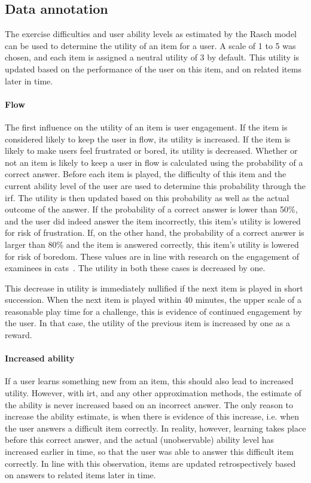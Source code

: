 \subsection{Data annotation}
\label{sec:utility}
The exercise difficulties and user ability levels as estimated by the Rasch model can be used to determine the utility of an item for a user.
A scale of 1 to 5 was chosen, and each item is assigned a neutral utility of 3 by default.
This utility is updated based on the performance of the user on this item, and on related items later in time.

\paragraph{Flow}
The first influence on the utility of an item is user engagement.
If the item is considered likely to keep the user in flow, its utility is increased.
If the item is likely to make users feel frustrated or bored, its utility is decreased.
Whether or not an item is likely to keep a user in flow is calculated using the probability of a correct answer.
Before each item is played, the difficulty of this item and the current ability level of the user are used to determine this probability through the \gls{irf}.
The utility is then updated based on this probability as well as the actual outcome of the answer.
If the probability of a correct answer is lower than 50\%, and the user did indeed answer the item incorrectly, this item's utility is lowered for risk of frustration.
If, on the other hand, the probability of a correct answer is larger than 80\% and the item is answered correctly, this item's utility is lowered for risk of boredom.
These values are in line with research on the engagement of examinees in \glspl{cat}~\cite{ling2017computerized,bolton1976handbook,moeyaert2016easy}.
The utility in both these cases is decreased by one.

This decrease in utility is immediately nullified if the next item is played in short succession.
When the next item is played within 40 minutes, the upper scale of a reasonable play time for a challenge, this is evidence of continued engagement by the user.
In that case, the utility of the previous item is increased by one as a reward.

\paragraph{Increased ability}
If a user learns something new from an item, this should also lead to increased utility.
However, with \gls{irt}, and any other approximation methods, the estimate of the ability is never increased based on an incorrect answer.
The only reason to increase the ability estimate, is when there is evidence of this increase, i.e. when the user answers a difficult item correctly.
In reality, however, learning takes place before this correct answer, and the actual (unobservable) ability level has increased earlier in time, so that the user was able to answer this difficult item correctly.
In line with this observation, items are updated retrospectively based on answers to related items later in time.

